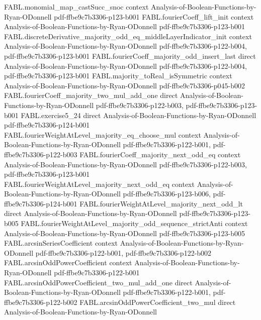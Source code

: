 \begin{theorem}
\proofstep
  {FABL.monomial_map_castSucc_snoc}
  {context}
  {Analysis-of-Boolean-Functions-by-Ryan-ODonnell}
  {pdf-ffbe9c7b3306-p123-b001}
\proofstep
  {FABL.fourierCoeff_lift_init}
  {context}
  {Analysis-of-Boolean-Functions-by-Ryan-ODonnell}
  {pdf-ffbe9c7b3306-p123-b001}
\proofstep
  {FABL.discreteDerivative_majority_odd_eq_middleLayerIndicator_init}
  {context}
  {Analysis-of-Boolean-Functions-by-Ryan-ODonnell}
  {pdf-ffbe9c7b3306-p122-b004,
    pdf-ffbe9c7b3306-p123-b001}
\proofstep
  {FABL.fourierCoeff_majority_odd_insert_last}
  {direct}
  {Analysis-of-Boolean-Functions-by-Ryan-ODonnell}
  {pdf-ffbe9c7b3306-p122-b004,
    pdf-ffbe9c7b3306-p123-b001}
\proofstep
  {FABL.majority_toReal_isSymmetric}
  {context}
  {Analysis-of-Boolean-Functions-by-Ryan-ODonnell}
  {pdf-ffbe9c7b3306-p045-b002}
\proofstep
  {FABL.fourierCoeff_majority_two_mul_add_one}
  {direct}
  {Analysis-of-Boolean-Functions-by-Ryan-ODonnell}
  {pdf-ffbe9c7b3306-p122-b003,
    pdf-ffbe9c7b3306-p123-b001}
\proofstep
  {FABL.exercise5_24}
  {direct}
  {Analysis-of-Boolean-Functions-by-Ryan-ODonnell}
  {pdf-ffbe9c7b3306-p124-b001}
\proofstep
  {FABL.fourierWeightAtLevel_majority_eq_choose_mul}
  {context}
  {Analysis-of-Boolean-Functions-by-Ryan-ODonnell}
  {pdf-ffbe9c7b3306-p122-b001,
    pdf-ffbe9c7b3306-p122-b003}
\proofstep
  {FABL.fourierCoeff_majority_next_odd_eq}
  {context}
  {Analysis-of-Boolean-Functions-by-Ryan-ODonnell}
  {pdf-ffbe9c7b3306-p122-b003,
    pdf-ffbe9c7b3306-p123-b001}
\proofstep
  {FABL.fourierWeightAtLevel_majority_next_odd_eq}
  {context}
  {Analysis-of-Boolean-Functions-by-Ryan-ODonnell}
  {pdf-ffbe9c7b3306-p123-b006,
    pdf-ffbe9c7b3306-p124-b001}
\proofstep
  {FABL.fourierWeightAtLevel_majority_next_odd_lt}
  {direct}
  {Analysis-of-Boolean-Functions-by-Ryan-ODonnell}
  {pdf-ffbe9c7b3306-p123-b005}
\proofstep
  {FABL.fourierWeightAtLevel_majority_odd_sequence_strictAnti}
  {context}
  {Analysis-of-Boolean-Functions-by-Ryan-ODonnell}
  {pdf-ffbe9c7b3306-p123-b005}
\proofstep
  {FABL.arcsinSeriesCoefficient}
  {context}
  {Analysis-of-Boolean-Functions-by-Ryan-ODonnell}
  {pdf-ffbe9c7b3306-p122-b001,
    pdf-ffbe9c7b3306-p122-b002}
\proofstep
  {FABL.arcsinOddPowerCoefficient}
  {context}
  {Analysis-of-Boolean-Functions-by-Ryan-ODonnell}
  {pdf-ffbe9c7b3306-p122-b001}
\proofstep
  {FABL.arcsinOddPowerCoefficient_two_mul_add_one}
  {direct}
  {Analysis-of-Boolean-Functions-by-Ryan-ODonnell}
  {pdf-ffbe9c7b3306-p122-b001,
    pdf-ffbe9c7b3306-p122-b002}
\proofstep
  {FABL.arcsinOddPowerCoefficient_two_mul}
  {direct}
  {Analysis-of-Boolean-Functions-by-Ryan-ODonnell}

\end{theorem}
